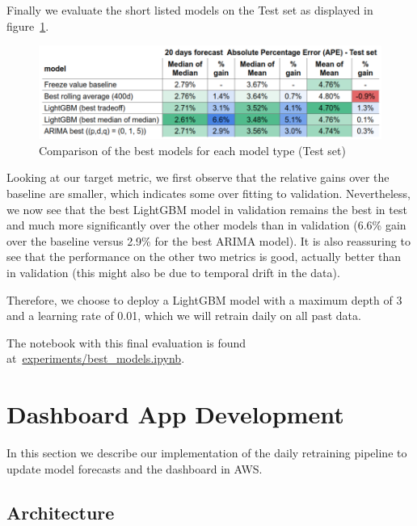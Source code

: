\documentclass[10pt]{article}
\begin{document}
{\label{961135}}

Finally we evaluate the short listed models on the Test set as displayed
in figure~{\ref{585771}}.
\begin{figure}[H]
\begin{center}
\includegraphics[width=0.84\columnwidth]{figures/screenshot3/screenshot}
\caption{{Comparison of the best models for each model type (Test set)
{\label{585771}}%
}}
\end{center}
\end{figure}

Looking at our target metric, we first observe that the relative gains
over the baseline are smaller, which indicates some over fitting to
validation. Nevertheless, we now see that the best LightGBM model in
validation remains the best in test and much more significantly over the
other models than in validation (6.6\% gain over the baseline versus
2.9\% for the best ARIMA model). It is also reassuring to see that the
performance on the other two metrics is good, actually better than in
validation (this might also be due to temporal drift in the data).

Therefore, we choose to deploy a LightGBM model with a maximum depth of
3 and a learning rate of 0.01, which we will retrain daily on all past
data.

The notebook with this final evaluation is found
at~\href{https://github.com/marcoopsampaio/aws_ml_eng_project_stock_prediction/blob/main/experiments/best_models.ipynb}{experiments/best\_models.ipynb}.

\section{Dashboard App Development}

{\label{615612}}

In this section we describe our implementation of the daily retraining
pipeline to update model forecasts and the dashboard in AWS.~

\subsection{Architecture}
\end{document}
